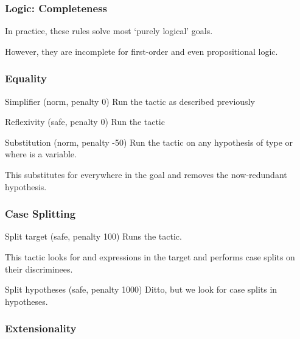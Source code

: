 \documentclass[xetex]{beamer}
\newcommand{\orange}[1]{\textcolor{orange}{#1}}
\newenvironment{rapppic}{\begin{tikzpicture}[outer sep=auto, level distance=2em]}{\end{tikzpicture}}
\newenvironment{rapp}{%
  \begin{tcolorbox}
  \begin{center}
  \begin{rapppic}
}{
  \end{rapppic}
  \end{center}
  \end{tcolorbox}%
}
\begin{document}
\begin{frame}
  \frametitle{Logic: Completeness}

  In practice, these rules solve most \enquote*{purely logical} goals.

  However, they are incomplete for first-order and even propositional logic.
\end{frame}

\begin{frame}
  \frametitle{Equality}

  \begin{block}{Simplifier (norm, penalty 0)}
    Run the  tactic as described previously
  \end{block}

  \pause

  \begin{block}{Reflexivity (safe, penalty 0)}
    Run the  tactic
  \end{block}

  \pause

  \begin{block}{Substitution (norm, penalty -50)}
    Run the  tactic on any hypothesis of type  or  where  is a variable.

    This substitutes  for  everywhere in the goal and removes the now-redundant hypothesis.
  \end{block}
\end{frame}

\begin{frame}
  \frametitle{Case Splitting}

  \begin{block}{Split target (safe, penalty 100)}
    Runs the  tactic.

    This tactic looks for  and  expressions in the target and performs case splits on their discriminees.
  \end{block}

  \pause

  \begin{block}{Split hypotheses (safe, penalty 1000)}
    Ditto, but we look for case splits in hypotheses.
  \end{block}
\end{frame}

\begin{frame}
  \frametitle{Extensionality}

\end{frame}
\end{document}
